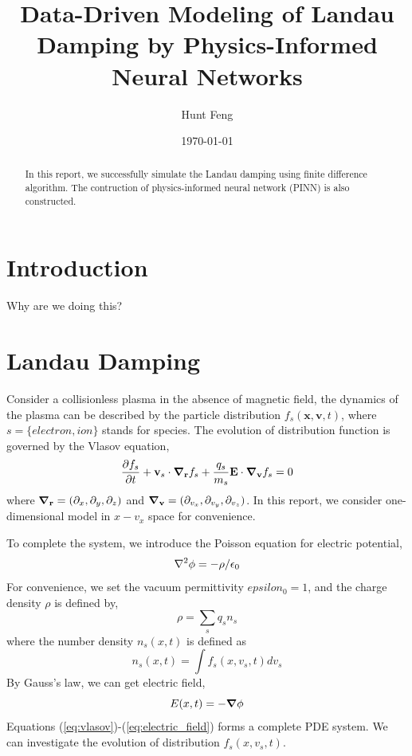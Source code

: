 \documentclass{article}
\title{Data-Driven Modeling of Landau Damping by Physics-Informed Neural Networks}
\author{Hunt Feng}
\date{\today}
\begin{document}
    \maketitle

    \begin{abstract}
        In this report, we successfully simulate the Landau damping using finite difference algorithm. The contruction of physics-informed neural network (PINN) is also constructed.
    \end{abstract}

    \section{Introduction}
    Why are we doing this?
    
    \section{Landau Damping}
    Consider a collisionless plasma in the absence of magnetic field, the dynamics of the plasma can be described by the particle distribution $f_s(\mathbf{x},\mathbf{v},t)$, where $s=\{electron, ion\}$ stands for species. The evolution of distribution function is governed by the Vlasov equation,
    \begin{equation} \label{eq:vlasov}
        \pdv{f_s}{t} + \mathbf{v}_s\cdot \grad_\mathbf{r} f_s + \frac{q_s}{m_s}\mathbf{E}\cdot\grad_\mathbf{v} f_s = 0
    \end{equation}
    where $\grad_\mathbf{r}=(\partial_x, \partial_y, \partial_z)$ and $\grad_\mathbf{v}=(\partial_{v_x}, \partial_{v_y}, \partial_{v_z})$. In this report, we consider one-dimensional model in $x-v_x$ space for convenience. 
    
    To complete the system, we introduce the Poisson equation for electric potential,
    \begin{equation} \label{eq:poisson}
        \laplacian\phi = -\rho/\epsilon_0
    \end{equation}
    For convenience, we set the vacuum permittivity $epsilon_0=1$, and the charge density $\rho$ is defined by,
    \begin{equation} \label{eq:charge_density}
        \rho = \sum_s q_sn_s
    \end{equation}
    where the number density $n_s(x,t)$ is defined as
    \begin{equation} \label{eq:number_density}
        n_s(x,t) = \int f_s(x,v_s,t) dv_s
    \end{equation}
    By Gauss's law, we can get electric field,
    \begin{equation}\label{eq:electric_field}
        E(x,t) = -\grad\phi
    \end{equation}
    Equations (\ref{eq:vlasov})-(\ref{eq:electric_field}) forms a complete PDE system. We can investigate the evolution of distribution $f_s(x,v_s,t)$.
\end{document}
